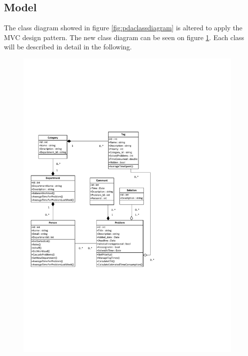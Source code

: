 \subsection{Model}
\label{sub:modelComponent}
The class diagram showed in figure \ref{fig:pdaclassdiagram} is altered to apply the MVC design pattern.
The new class diagram can be seen on figure \ref{fig:ClassDiagramV2}.
Each class will be described in detail in the following.
\begin{figure}[p]%
\includegraphics[clip=true, width=1.00\textwidth, trim=0.5cm 5cm 8cm 7cm]{input/component_design/ClassDiagramV2.pdf}%
%
\label{fig:ClassDiagramV2}%
\end{figure}

